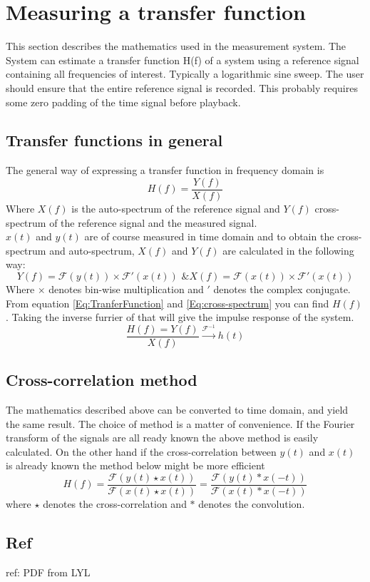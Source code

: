 \section{Measuring a transfer function}
This section describes the mathematics used in the measurement system. The System can estimate a transfer function H(f) of a system using a reference signal containing all frequencies of interest. Typically  a logarithmic sine sweep. The user should ensure that the entire reference signal is recorded. This probably requires some zero padding of the time signal before playback.
\subsection{Transfer functions in general}
The general way of expressing a transfer function in frequency domain is
\begin{equation}
H(f)=\frac{Y(f)}{X(f)}
\label{Eq:TranferFunction}
\end{equation}
Where $X(f)$ is the auto-spectrum of the reference signal and $Y(f)$ cross-spectrum of the reference signal and the measured signal.\\
$x(t)$ and $y(t)$ are of course measured in time domain and to obtain the cross-spectrum and auto-spectrum, $X(f)$ and $Y(f)$ are calculated in the following way:
\begin{equation}
Y(f)=\mathscr{F}(y(t))\times\mathscr{F}'(x(t)) \text{ \& } X(f)=\mathscr{F}(x(t))\times\mathscr{F}'(x(t))
\label{Eq:cross-spectrum}
\end{equation}
Where $\times$ denotes bin-wise multiplication and $'$ denotes the complex conjugate. \\
From equation \ref{Eq:TranferFunction} and \ref{Eq:cross-spectrum} you can find $H(f)$. Taking the inverse furrier of that will give the impulse response of the system. 
\begin{equation}
\frac{H(f) = Y(f)}{X(f)} \xrightarrow{\mathscr{F}^{-1}} h(t)
\label{Eq:Impulseresponse}
\end{equation} 

\subsection{Cross-correlation method}
The mathematics described above can be converted to time domain, and yield the same result. The choice of method is a matter of convenience. If the Fourier transform of the signals are all ready known the above method is easily calculated. On the other hand if the cross-correlation between $y(t)$ and $x(t)$ is already known the method below might be more efficient
\begin{equation}
H(f)=\dfrac{\mathscr{F}(y(t)\star x(t))} {\mathscr{F}(x(t)\star x(t))}=
\dfrac{\mathscr{F}(y(t)\ast x(-t))} {\mathscr{F}(x(t)\ast x(-t))}
\label{Eq:Xcorr method}
\end{equation}  
where $\star $ denotes the cross-correlation and $\ast $ denotes the convolution. %

\subsection{Ref}
ref: PDF from LYL




